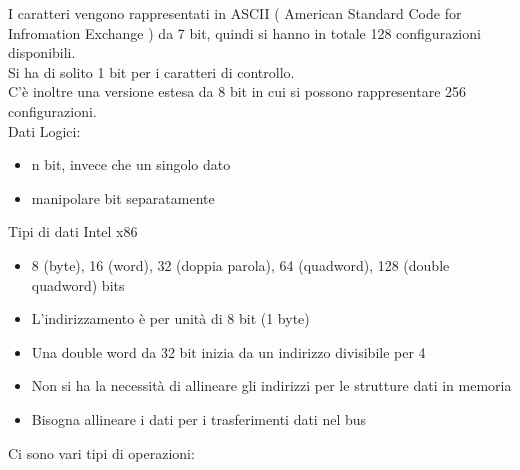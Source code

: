 \documentclass[12pt, a4paper]{report}
\begin{document}
I caratteri vengono rappresentati in ASCII ( American Standard Code for
Infromation Exchange ) da 7 bit, quindi si hanno in totale 128 configurazioni
disponibili.\\
Si ha di solito 1 bit per i caratteri di controllo.\\
C'è inoltre una versione estesa da 8 bit in cui si possono rappresentare 256 
configurazioni.\\
Dati Logici:

\begin{itemize}
	\item n bit, invece che un singolo dato
	\item manipolare bit separatamente
\end{itemize}

Tipi di dati Intel x86

\begin{itemize}
	\item 8 (byte), 16 (word), 32 (doppia parola), 64 (quadword), 128 (double quadword) bits
	\item L'indirizzamento è per unità di 8 bit (1 byte)
	\item Una double word da 32 bit inizia da un indirizzo divisibile per 4
	\item Non si ha la necessità di allineare gli indirizzi per le strutture dati in memoria
	\item Bisogna allineare i dati per i trasferimenti dati nel bus
\end{itemize}

Ci sono vari tipi di operazioni:
\end{document}
